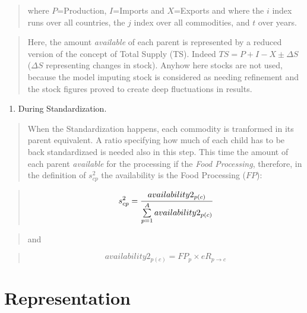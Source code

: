 \documentclass[]{article}
\providecommand{\tightlist}{%
  \setlength{\itemsep}{0pt}\setlength{\parskip}{0pt}}
\begin{document}
\begin{quote}
where \(P\)=Production, \(I\)=Imports and \(X\)=Exports and where the
\(i\) index runs over all countries, the \(j\) index over all
commodities, and \(t\) over years.
\end{quote}

\begin{quote}
Here, the amount \emph{available} of each parent is represented by a
reduced version of the concept of Total Supply (TS). Indeed
\(TS = P + I - X \pm \Delta S\) (\(\Delta S\) representing changes in
stock). Anyhow here stocks are not used, because the model imputing
stock is considered as needing refinement and the stock figures proved
to create deep fluctuations in results.
\end{quote}

\begin{enumerate}
\def\labelenumi{\arabic{enumi}.}
\setcounter{enumi}{1}
\tightlist
\item
  During Standardization.
\end{enumerate}

\begin{quote}
When the Standardization happens, each commodity is tranformed in its
parent equivalent. A ratio specifying how much of each child has to be
back standardizaed is needed also in this step. This time the amount of
each parent \emph{available} for the processing if the \emph{Food
Processing}, therefore, in the definition of \(s^2_{cp}\) the
availability is the Food Processing (\(FP\)):
\end{quote}

\begin{quote}
\begin{equation}
\label{eq:shares}
s^{2}_{cp} = \cfrac{availability2_{p(c)}}{\sum \limits_{p=1}^A{availability2_{p(c)}}}
\end{equation}
\end{quote}

\begin{quote}
and
\end{quote}

\begin{quote}
\begin{equation}
\label{eq:availability2}
availability2_{p(c)} = FP_{p}\times eR_{p\to c}
\end{equation}
\end{quote}

\section{Representation}\label{representation}
\end{document}

